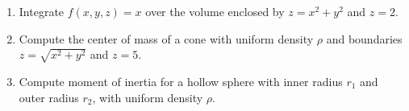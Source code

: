 \documentclass[letterpaper,11pt]{article}
\begin{document}
\begin{enumerate}
  \newline
  \newline
  \newline
  \newline
\item Integrate $f(x, y, z) = x$ over the volume enclosed by $z = x^2 + y^2$ and $z = 2$.\\
  \newpage
\item Compute the center of mass of a cone with uniform density $\rho$ and boundaries $z = \sqrt{x^2 + y^2}$ and $z = 5$.\\
  \newline
  \newline
  \newline
  \newline
  \newline
  \newline
  \newline
  \newline
  \newline
  \newline
  \newline
  \newline
  \newline
  \newline
  \newline
  \newline
  \newline
  \newline
  \newline
  \newline
\item Compute moment of inertia for a hollow sphere with inner radius $r_1$ and outer radius $r_2$, with uniform density $\rho$.\\
  \newline
  \newline
  \newline
  \newline
  \newline
  \newline
  \newline
  \newline
  \newline
\end{enumerate}
\end{document}
